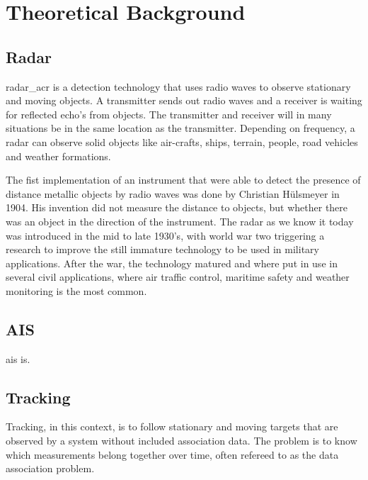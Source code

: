 
\chapter{Theoretical Background}\label{chapter:theoretical_background}
\section{Radar}
\gls{radar_acr} is a detection technology that uses radio waves to observe stationary and moving objects. A transmitter sends out radio waves and a receiver is waiting for reflected echo's from objects. The transmitter and receiver will in many situations be in the same location as the transmitter. Depending on frequency, a radar can observe solid objects like air-crafts, ships, terrain, people, road vehicles and weather formations.

The fist implementation of an instrument that were able to detect the presence of distance metallic objects by radio waves was done by Christian Hülsmeyer in 1904. His invention did not measure the distance to objects, but whether there was an object in the direction of the instrument. The radar as we know it today was introduced in the mid to late 1930's, with world war two triggering a research to improve the still immature technology to be used in military applications. After the war, the technology matured and where put in use in several civil applications, where air traffic control, maritime safety and weather monitoring is the most common.



\section{AIS}
\gls{ais} is.

\section{Tracking}
Tracking, in this context, is to follow stationary and moving targets that are observed by a system without included association data. The problem is to know which measurements belong together over time, often refereed to as the data association problem. 

